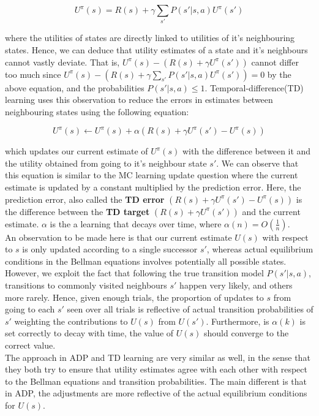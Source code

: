 \documentclass[11pt]{article}
\begin{document}
$$
U^{\pi}(s) = R(s) + \gamma \sum_{s'} P(s' | s, a) U^{\pi} (s')
$$

where the utilities of states are directly linked to utilities of it's neighbouring states. Hence, we can deduce that utility estimates of a state and it's neighbours cannot vastly deviate. That is, $U^{\pi}(s) - (R(s) + \gamma U^{\pi} (s'))$ cannot differ too much since $U^{\pi}(s) - (R(s) + \gamma \sum_{s'} P(s' | s, a) U^{\pi} (s')) = 0$ by the above equation, and the probabilities $P(s' | s, a) \leq 1$. Temporal-difference(TD) learning uses this observation to reduce the errors in estimates between neighbouring states using the following equation:

$$
U^{\pi}(s) \leftarrow U^{\pi}(s) + \alpha\left( R(s) + \gamma U^{\pi}(s') - U^{\pi}(s) \right)
$$

which updates our current estimate of $U^{\pi}(s)$ with the difference between it and the utility obtained from going to it's neighbour state $s'$. We can observe that this equation is similar to the MC learning update question where the current estimate is updated by a constant multiplied by the prediction error. Here, the prediction error, also called the \textbf{TD error} $\left( R(s) + \gamma U^{\pi}(s') - U^{\pi}(s) \right)$ is the difference between the \textbf{TD target} $\left( R(s) + \gamma U^{\pi}(s')\right)$ and the current estimate. $\alpha$ is the a learning that decays over time, where $\alpha(n) = O(\frac{1}{n})$.\\

An observation to be made here is that our current estimate $U(s)$ with respect to $s$ is only updated according to a single successor $s'$, whereas actual equilibrium conditions in the Bellman equations involves potentially all possible states. However, we exploit the fact that following the true transition model $P(s' | s, a)$, transitions to commonly visited neighbours $s'$ happen very likely, and others more rarely. Hence, given enough trials, the proportion of updates to $s$ from going to each $s'$ seen over all trials is reflective of actual transition probabilities of $s'$ weighting the contributions to $U(s)$ from $U(s')$. Furthermore, is $\alpha(k)$ is set correctly to decay with time, the value of $U(s)$ should converge to the correct value.\\

The approach in ADP and TD learning are very similar as well, in the sense that they both try to ensure that utility estimates agree with each other with respect to the Bellman equations and transition probabilities. The main different is that in ADP, the adjustments are more reflective of the actual equilibrium conditions for $U(s)$.\\
\end{document}
